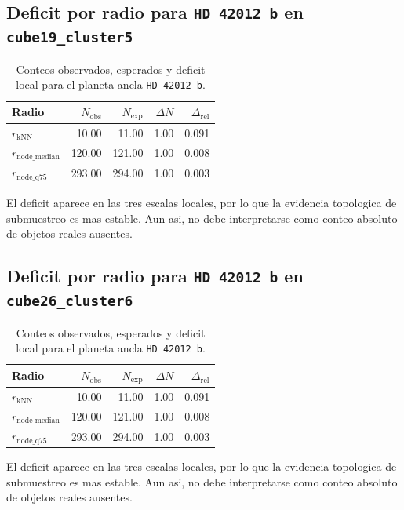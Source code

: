 \subsection{Deficit por radio para \texttt{HD 42012 b} en \texttt{cube19\_cluster5}}
\begin{table}[H]
\centering
\small
\caption{Conteos observados, esperados y deficit local para el planeta ancla \texttt{HD 42012 b}.}
\begin{tabular}{lrrrr}
\toprule
Radio & $N_{\mathrm{obs}}$ & $N_{\mathrm{exp}}$ & $\Delta N$ & $\Delta_{\mathrm{rel}}$ \\
\midrule
$r_{\mathrm{kNN}}$ & 10.00 & 11.00 & 1.00 & 0.091 \\
$r_{\mathrm{node\_median}}$ & 120.00 & 121.00 & 1.00 & 0.008 \\
$r_{\mathrm{node\_q75}}$ & 293.00 & 294.00 & 1.00 & 0.003 \\
\bottomrule
\end{tabular}
\end{table}
El deficit aparece en las tres escalas locales, por lo que la evidencia topologica de submuestreo es mas estable. Aun asi, no debe interpretarse como conteo absoluto de objetos reales ausentes.

\subsection{Deficit por radio para \texttt{HD 42012 b} en \texttt{cube26\_cluster6}}
\begin{table}[H]
\centering
\small
\caption{Conteos observados, esperados y deficit local para el planeta ancla \texttt{HD 42012 b}.}
\begin{tabular}{lrrrr}
\toprule
Radio & $N_{\mathrm{obs}}$ & $N_{\mathrm{exp}}$ & $\Delta N$ & $\Delta_{\mathrm{rel}}$ \\
\midrule
$r_{\mathrm{kNN}}$ & 10.00 & 11.00 & 1.00 & 0.091 \\
$r_{\mathrm{node\_median}}$ & 120.00 & 121.00 & 1.00 & 0.008 \\
$r_{\mathrm{node\_q75}}$ & 293.00 & 294.00 & 1.00 & 0.003 \\
\bottomrule
\end{tabular}
\end{table}
El deficit aparece en las tres escalas locales, por lo que la evidencia topologica de submuestreo es mas estable. Aun asi, no debe interpretarse como conteo absoluto de objetos reales ausentes.

